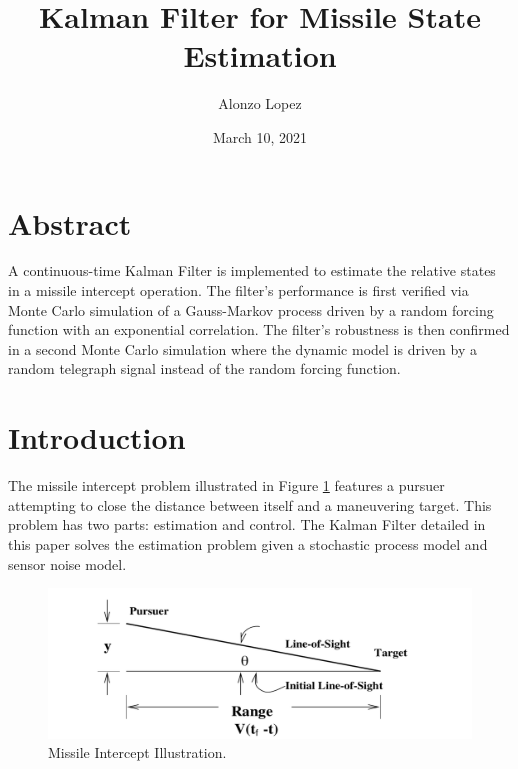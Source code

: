 \documentclass{article}
\title{Kalman Filter for Missile State Estimation}
\author{Alonzo Lopez}
\date{March 10, 2021}
\begin{document}
\maketitle

\section{Abstract}
A continuous-time Kalman Filter is implemented to estimate the relative states in a missile intercept operation. The filter's performance is first verified via
Monte Carlo simulation of a Gauss-Markov process driven by a random forcing function with an exponential correlation. The filter's robustness is then confirmed in 
a second Monte Carlo simulation where the dynamic model is driven by a random telegraph signal instead of the random forcing function.

\section{Introduction}
The missile intercept problem illustrated in Figure \ref{MissileIntercept} features a pursuer attempting to close the distance between itself and a maneuvering target. 
This problem has two parts: estimation and control. The Kalman Filter detailed in this paper solves the estimation problem given a stochastic process model and 
sensor noise model. 

\begin{figure}
    \centering
    \includegraphics[width=1\textwidth]{missile_intercept.png}
    \caption{Missile Intercept Illustration.}
    \label{MissileIntercept}
\end{figure}
\end{document}
